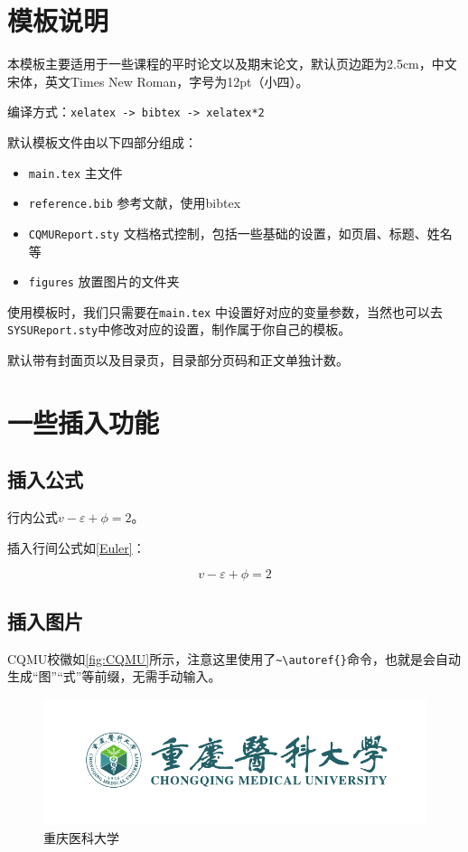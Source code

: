 \documentclass{CQMUReport}
\begin{document}
\section{模板说明}

本模板主要适用于一些课程的平时论文以及期末论文，默认页边距为2.5cm，中文宋体，英文Times New Roman，字号为12pt（小四）。

编译方式：\verb|xelatex -> bibtex -> xelatex*2|

默认模板文件由以下四部分组成：

\begin{itemize}
    \item \texttt{main.tex} 主文件
    \item \texttt{reference.bib} 参考文献，使用bibtex
    \item \texttt{CQMUReport.sty} 文档格式控制，包括一些基础的设置，如页眉、标题、姓名等
    \item \texttt{figures} 放置图片的文件夹
\end{itemize}

使用模板时，我们只需要在\texttt{main.tex} 中设置好对应的变量参数，当然也可以去\texttt{SYSUReport.sty}中修改对应的设置，制作属于你自己的模板。

默认带有封面页以及目录页，目录部分页码和正文单独计数。

\section{一些插入功能}
\subsection{插入公式}

行内公式$v-\varepsilon+\phi=2$。

插入行间公式如\autoref{Euler}：

\begin{equation}
    v-\varepsilon+\phi=2
    \label{Euler}
\end{equation}

\subsection{插入图片}

CQMU校徽如\autoref{fig:CQMU}所示，注意这里使用了\verb|~\autoref{}|命令，也就是会自动生成“图”“式”等前缀，无需手动输入。

\begin{figure}[!htbp]
    \centering
    \includegraphics[width =.4\textwidth]{figures/cqmu_logo.pdf}
    \caption{重庆医科大学}
    \label{fig:SYSU}
\end{figure}
\end{document}
